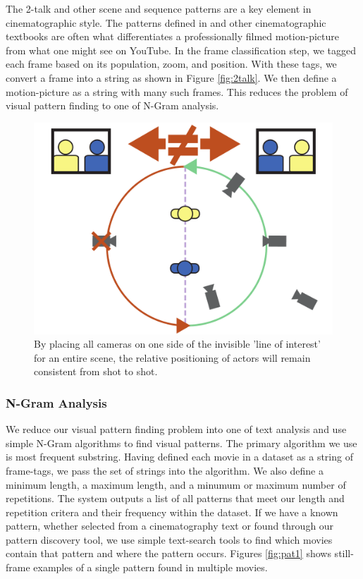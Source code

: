 The 2-talk and other scene and sequence patterns are a key element in cinematographic style. The patterns defined in \cite{arijon_grammar_1991} and other cinematographic textbooks are often what differentiates a professionally filmed motion-picture from what one might see on YouTube. In the frame classification step, we tagged each frame based on its population, zoom, and position. With these tags, we convert a frame into a string as shown in Figure \ref{fig:2talk}. We then define a motion-picture as a string with many such frames. This reduces the problem of visual pattern finding to one of N-Gram analysis.

\begin{figure}[tb]
\begin{center}
\includegraphics[width=0.98\linewidth]
    {fig/lineOfAction.pdf}
\end{center}
\caption{By placing all cameras on one side of the invisible 'line of interest' for an entire scene, the relative positioning of actors will remain consistent from shot to shot.}
\label{fig:lineOfInterest}
\end{figure}

\subsubsection*{N-Gram Analysis}

We reduce our visual pattern finding problem into one of text analysis and use simple N-Gram algorithms to find visual patterns. The primary algorithm we use is most frequent substring. Having defined each movie in a dataset as a string of frame-tags, we pass the set of strings into the algorithm. We also define a minimum length, a maximum length, and a minumum or maximum number of repetitions. The system outputs a list of all patterns that meet our length and repetition critera and their frequency within the dataset. If we have a known pattern, whether selected from a cinematography text or found through our pattern discovery tool, we use simple text-search tools to find which movies contain that pattern and where the pattern occurs. Figures \ref{fig:pat1} shows still-frame examples of a single pattern found in multiple movies.



